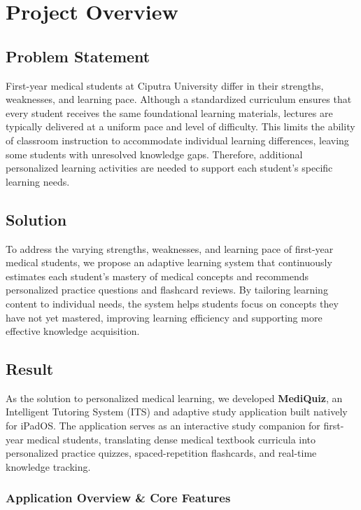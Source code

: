 \section*{Project Overview}

\subsection*{Problem Statement}

First-year medical students at Ciputra University differ in their strengths, weaknesses, and learning pace. Although a standardized curriculum ensures that every student receives the same foundational learning materials, lectures are typically delivered at a uniform pace and level of difficulty. This limits the ability of classroom instruction to accommodate individual learning differences, leaving some students with unresolved knowledge gaps. Therefore, additional personalized learning activities are needed to support each student's specific learning needs.

\subsection*{Solution}

To address the varying strengths, weaknesses, and learning pace of first-year medical students, we propose an adaptive learning system that continuously estimates each student's mastery of medical concepts and recommends personalized practice questions and flashcard reviews. By tailoring learning content to individual needs, the system helps students focus on concepts they have not yet mastered, improving learning efficiency and supporting more effective knowledge acquisition.

\subsection*{Result}

As the solution to personalized medical learning, we developed \textbf{MediQuiz}, an Intelligent Tutoring System (ITS) and adaptive study application built natively for iPadOS. The application serves as an interactive study companion for first-year medical students, translating dense medical textbook curricula into personalized practice quizzes, spaced-repetition flashcards, and real-time knowledge tracking.

\subsubsection*{Application Overview \& Core Features}

